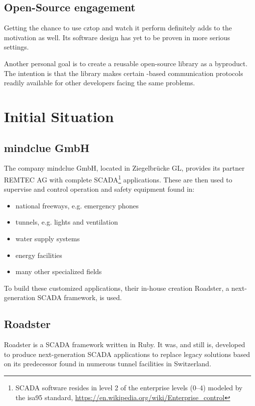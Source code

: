 \subsection{Open-Source engagement}
Getting the chance to use \gls{cztop} and watch it perform definitely adds to
the motivation as well. Its software design has yet to be proven in more
serious settings.

Another personal goal is to create a reusable open-source library as a
byproduct. The intention is that the library makes certain \zmq-based
communication protocols readily available for other developers facing the same
problems.

\section{Initial Situation}

\subsection{mindclue GmbH}
The company mindclue GmbH, located in Ziegelbr\"ucke GL, provides its partner
REMTEC AG with complete \gls{SCADA}\footnote{SCADA software resides in level 2 of the enterprise levels (0--4) modeled by the \gls{isa95} standard, \url{https://en.wikipedia.org/wiki/Enterprise_control}} applications. These are then used to
supervise and control operation and safety equipment found in:

\begin{itemize}
\item national freeways, e.g. emergency phones
\item tunnels, e.g. lights and ventilation
\item water supply systems
\item energy facilities
\item many other specialized fields
\end{itemize}

To build these customized applications, their in-house creation
Roadster, a next-generation SCADA framework, is used.

\subsection{Roadster}
Roadster is a SCADA framework written in Ruby. It was, and still
is, developed to produce next-generation SCADA applications to replace legacy
solutions based on its predecessor found in numerous tunnel
facilities in Switzerland.


